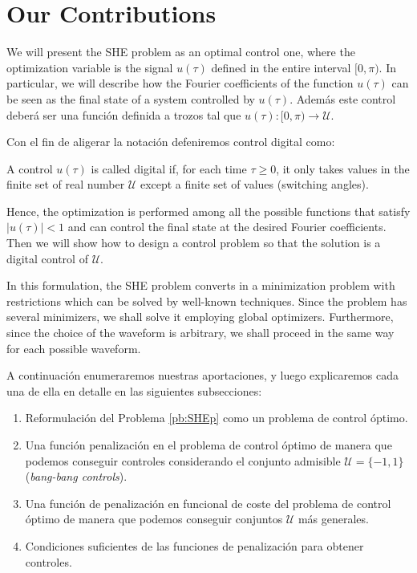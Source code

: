 \section{Our Contributions}

We will present the SHE problem as an optimal control one, where the optimization variable is the signal $u(\tau)$ defined in the entire interval $[0,\pi)$. 
%
In particular, we will describe how the Fourier coefficients of the function $u(\tau)$ can be seen as the final state of a system controlled by $u (\tau)$. Además este control deberá ser una función definida a trozos tal que $u(\tau):[0,\pi) \rightarrow \mathcal{U}$. 

Con el fin de aligerar la notación defeniremos control digital como:
\vspace{1em}
\begin{definition}
    A control $u(\tau)$ is called digital if, for each time $\tau\geq 0$, it only takes values in the finite set of real number $\mathcal{U}$ except a finite set of values (switching angles).  
\end{definition}
%
Hence, the optimization is performed among all the possible functions that satisfy $|u(\tau)|<1 $ and can control the final state at the desired Fourier coefficients. 
%
Then we will show how to design a control problem so that the solution is a digital control of $\mathcal{U}$.



In this formulation, the SHE problem converts in a minimization problem with restrictions which can be solved by well-known techniques. 
%
Since the problem has several minimizers, we shall solve it employing global optimizers. 
%
Furthermore, since the choice of the waveform is arbitrary, we shall proceed in the same way for each possible waveform. 

A continuación enumeraremos nuestras aportaciones, y luego explicaremos cada una de ella en detalle en las siguientes subsecciones:
\begin{enumerate}
    \item Reformulación del Problema \ref{pb:SHEp} como un problema de control óptimo.
    \item Una función penalización en el problema de control óptimo de manera que podemos conseguir controles considerando el conjunto admisible $\mathcal{U}=\{-1,1\}$(\emph{bang-bang controls}).
    \item Una función de penalización en funcional de coste del problema de control óptimo de manera que podemos conseguir conjuntos $\mathcal{U}$ más generales.
    \item Condiciones suficientes de las funciones de penalización para obtener controles.
\end{enumerate}

